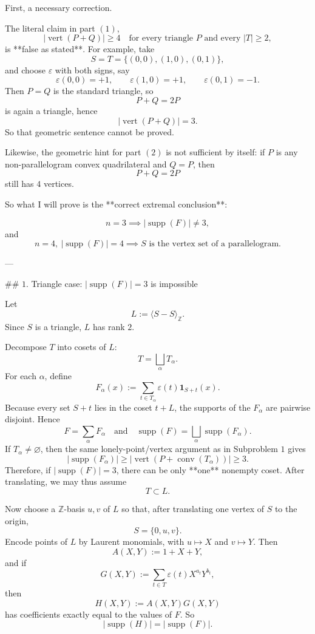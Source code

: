 First, a necessary correction.

The literal claim in part \( (1) \),
\[
|\operatorname{vert}(P+Q)|\ge 4 \quad\text{for every triangle } P \text{ and every } |T|\ge 2,
\]
is **false as stated**. For example, take
\[
S=T=\{(0,0),(1,0),(0,1)\},
\]
and choose \(\varepsilon\) with both signs, say
\[
\varepsilon(0,0)=+1,\qquad \varepsilon(1,0)=+1,\qquad \varepsilon(0,1)=-1.
\]
Then \(P=Q\) is the standard triangle, so
\[
P+Q=2P
\]
is again a triangle, hence
\[
|\operatorname{vert}(P+Q)|=3.
\]
So that geometric sentence cannot be proved.

Likewise, the geometric hint for part \( (2) \) is not sufficient by itself: if \(P\) is any non-parallelogram convex quadrilateral and \(Q=P\), then
\[
P+Q=2P
\]
still has \(4\) vertices.

So what I will prove is the **correct extremal conclusion**:

\[
n=3 \implies |\operatorname{supp}(F)|\neq 3,
\]
and
\[
n=4,\ |\operatorname{supp}(F)|=4 \implies S \text{ is the vertex set of a parallelogram}.
\]

---

## \(1.\) Triangle case: \( |\operatorname{supp}(F)|=3 \) is impossible

Let
\[
L:=\langle S-S\rangle_{\mathbb Z}.
\]
Since \(S\) is a triangle, \(L\) has rank \(2\).

Decompose \(T\) into cosets of \(L\):
\[
T=\bigsqcup_\alpha T_\alpha.
\]
For each \(\alpha\), define
\[
F_\alpha(x):=\sum_{t\in T_\alpha}\varepsilon(t)\mathbf 1_{S+t}(x).
\]
Because every set \(S+t\) lies in the coset \(t+L\), the supports of the \(F_\alpha\) are pairwise disjoint. Hence
\[
F=\sum_\alpha F_\alpha
\quad\text{and}\quad
\operatorname{supp}(F)=\bigsqcup_\alpha \operatorname{supp}(F_\alpha).
\]
If \(T_\alpha\neq\varnothing\), then the same lonely-point/vertex argument as in Subproblem \(1\) gives
\[
|\operatorname{supp}(F_\alpha)|\ge |\operatorname{vert}(P+\operatorname{conv}(T_\alpha))|\ge 3.
\]
Therefore, if \( |\operatorname{supp}(F)|=3 \), there can be only **one** nonempty coset. After translating, we may thus assume
\[
T\subset L.
\]

Now choose a \(\mathbb Z\)-basis \(u,v\) of \(L\) so that, after translating one vertex of \(S\) to the origin,
\[
S=\{0,u,v\}.
\]
Encode points of \(L\) by Laurent monomials, with \(u\mapsto X\) and \(v\mapsto Y\). Then
\[
A(X,Y):=1+X+Y,
\]
and if
\[
G(X,Y):=\sum_{t\in T}\varepsilon(t)X^{a_t}Y^{b_t},
\]
then
\[
H(X,Y):=A(X,Y)G(X,Y)
\]
has coefficients exactly equal to the values of \(F\). So
\[
|\operatorname{supp}(H)|=|\operatorname{supp}(F)|.
\]

